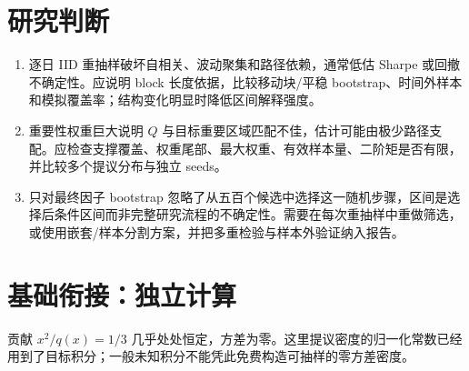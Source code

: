 \section*{研究判断}
\begin{enumerate}[leftmargin=*]
  \item 逐日 IID 重抽样破坏自相关、波动聚集和路径依赖，通常低估 Sharpe 或回撤不确定性。应说明 block 长度依据，比较移动块/平稳 bootstrap、时间外样本和模拟覆盖率；结构变化明显时降低区间解释强度。
  \item 重要性权重巨大说明 $Q$ 与目标重要区域匹配不佳，估计可能由极少路径支配。应检查支撑覆盖、权重尾部、最大权重、有效样本量、二阶矩是否有限，并比较多个提议分布与独立 seeds。
  \item 只对最终因子 bootstrap 忽略了从五百个候选中选择这一随机步骤，区间是选择后条件区间而非完整研究流程的不确定性。需要在每次重抽样中重做筛选，或使用嵌套/样本分割方案，并把多重检验与样本外验证纳入报告。
\end{enumerate}

\section*{基础衔接：独立计算}
贡献 $x^2/q(x)=1/3$ 几乎处处恒定，方差为零。这里提议密度的归一化常数已经用到了目标积分；一般未知积分不能凭此免费构造可抽样的零方差密度。

